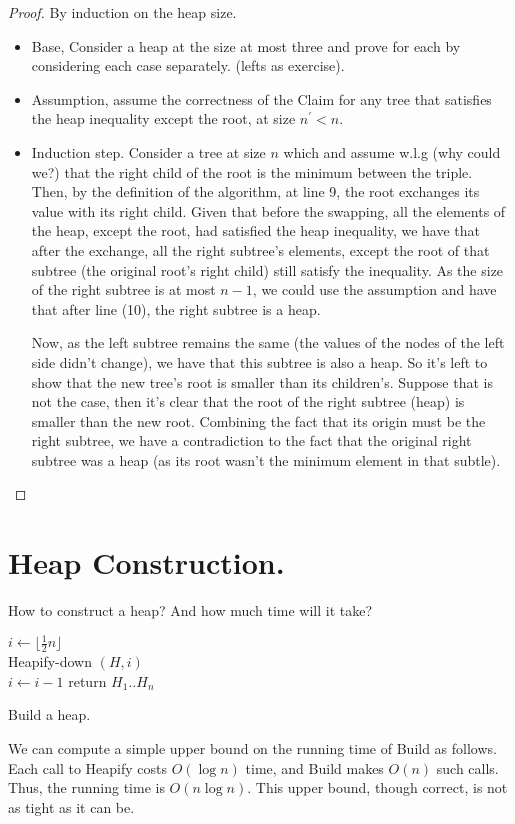 \begin{proof}
  
By induction on the heap size.  
 
\begin{itemize} 
  \item Base, Consider a heap at the size at most three and prove for each by considering each case separately. (lefts as exercise).  
  \item Assumption, assume the correctness of the Claim for any tree that satisfies the heap inequality except the root, at size $n^{\prime} < n$. 
  \item Induction step. Consider a tree at size $n$ which and assume w.l.g (why could we?) that the right child of the root is the minimum between the triple. Then, by the definition of the algorithm, at line 9, the root exchanges its value with its right child. Given that before the swapping, all the elements of the heap, except the root, had satisfied the heap inequality, we have that after the exchange, all the right subtree's elements, except the root of that subtree (the original root's right child) still satisfy the inequality. As the size of the right subtree is at most $n-1$, we could use the assumption and have that after line (10), the right subtree is a heap.  

    Now, as the left subtree remains the same (the values of the nodes of the left side didn't change), we have that this subtree is also a heap. So it's left to show that the new tree's root is smaller than its children's. Suppose that is not the case, then it's clear that the root of the right subtree (heap) is smaller than the new root. Combining the fact that its origin must be the right subtree, we have a contradiction to the fact that the original right subtree was a heap (as its root wasn't the minimum element in that subtle).  
 
\end{itemize} 
 \end{proof}

\section{Heap Construction.} How to construct a heap? And how much time will it take?   

\begin{algorithm}[H]
  $ i \leftarrow \lfloor \frac{1}{2}n  \rfloor $ \\
  { 
    Heapify-down $\left( H, i \right)$ \\ 
    $ i \leftarrow i - 1 $  
  }
return $H_{1} .. H_{n}$
\caption{ Build a heap. } 
\end{algorithm}
We can compute a simple upper bound on the running time of Build as follows. Each call to Heapify costs $O(\log n)$ time, and Build makes $O(n)$ such calls. Thus, the running time is $O(n \log n)$. This upper bound, though correct, is not as tight as it can be.

